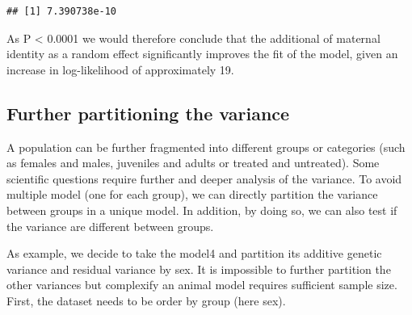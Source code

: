 \documentclass[
  12pt,
]{book}
\newenvironment{Shaded}{\begin{snugshade}}{\end{snugshade}}
\newcommand{\AttributeTok}[1]{\textcolor[rgb]{0.77,0.63,0.00}{#1}}
\newcommand{\DecValTok}[1]{\textcolor[rgb]{0.00,0.00,0.81}{#1}}
\newcommand{\FunctionTok}[1]{\textcolor[rgb]{0.00,0.00,0.00}{#1}}
\newcommand{\NormalTok}[1]{#1}
\newcommand{\OtherTok}[1]{\textcolor[rgb]{0.56,0.35,0.01}{#1}}
\newcommand{\SpecialCharTok}[1]{\textcolor[rgb]{0.00,0.00,0.00}{#1}}
\newcommand{\StringTok}[1]{\textcolor[rgb]{0.31,0.60,0.02}{#1}}
\begin{document}
\begin{verbatim}
## [1] 7.390738e-10
\end{verbatim}

As P \textless{} 0.0001 we would therefore conclude that the additional of maternal identity as a random effect significantly improves the fit of the model, given an increase in log-likelihood of approximately 19.

\hypertarget{further-partitioning-the-variance}{%
\subsection{Further partitioning the variance}\label{further-partitioning-the-variance}}

A population can be further fragmented into different groups or categories (such as females and males, juveniles and adults or treated and untreated). Some scientific questions require further and deeper analysis of the variance.
To avoid multiple model (one for each group), we can directly partition the variance between groups in a unique model. In addition, by doing so, we can also test if the variance are different between groups.

As example, we decide to take the model4 and partition its additive genetic variance and residual variance by sex. It is impossible to further partition the other variances but complexify an animal model requires sufficient sample size.\\
First, the dataset needs to be order by group (here sex).

\begin{Shaded}
\end{Shaded}
\end{document}
